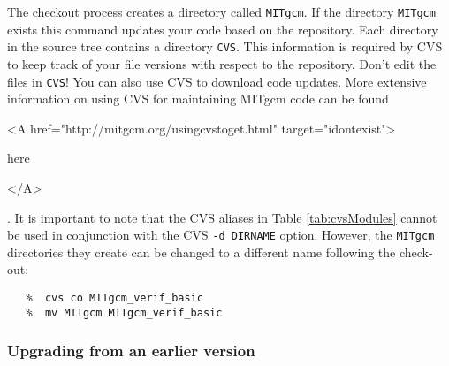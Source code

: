 The checkout process creates a directory called \texttt{MITgcm}. If
the directory \texttt{MITgcm} exists this command updates your code
based on the repository. Each directory in the source tree contains a
directory \texttt{CVS}. This information is required by CVS to keep
track of your file versions with respect to the repository. Don't edit
the files in \texttt{CVS}!  You can also use CVS to download code
updates.  More extensive information on using CVS for maintaining
MITgcm code can be found
\begin{rawhtml} <A href="http://mitgcm.org/usingcvstoget.html" target="idontexist"> \end{rawhtml}
here
\begin{rawhtml} </A> \end{rawhtml} 
.
It is important to note that the CVS aliases in Table
\ref{tab:cvsModules} cannot be used in conjunction with the CVS
\texttt{-d DIRNAME} option.  However, the \texttt{MITgcm} directories
they create can be changed to a different name following the check-out:
\begin{verbatim}
   %  cvs co MITgcm_verif_basic
   %  mv MITgcm MITgcm_verif_basic
\end{verbatim}

\subsubsection{Upgrading from an earlier version}

